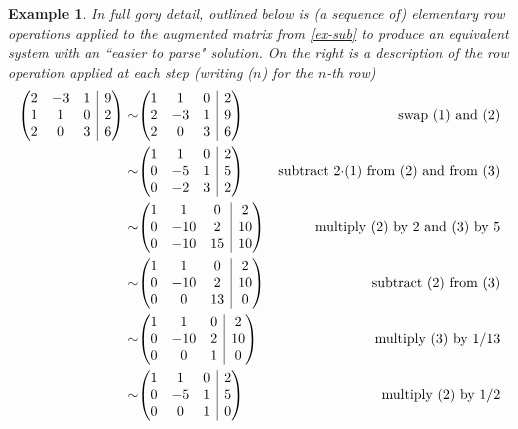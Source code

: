 \documentclass[12pt]{article}
\makeatletter
\numberwithin{equation}{subsection}
\numberwithin{figure}{subsection}
\theoremstyle{note}
\newtheorem{example}[subsection]{Example}
\newenvironment{amatrix}[1]{%
  \left(\begin{array}{@{}*{#1}{c}|c@{}}
}{%
  \end{array}\right)
}
\makeatother
\begin{document}
\begin{example} \label{ex-row-ops}  In full gory detail, outlined below is (a sequence of) elementary row operations applied to the augmented matrix from \eqref{ex-sub} to produce an equivalent system with an ``easier to parse" solution. On the right is a description of the row operation applied at each step (writing ($n$) for the $n$-th row)
{ \allowdisplaybreaks\begin{align*} \begin{amatrix}{3}  2 & -3 & 1 & 9 \\ 1 & 1 & 0 & 2 \\ 2 & 0 & 3 & 6 \end{amatrix} \sim & 
\begin{amatrix}{3}  1 & 1 & 0 & 2 \\ 2 & -3 & 1 & 9 \\  2 & 0 & 3 & 6 \end{amatrix} & \text{swap (1) and (2)}\\
\sim & \begin{amatrix}{3}  1 & 1 & 0 & 2 \\ 0 & -5 & 1 & 5 \\  0 & -2 & 3 & 2 \end{amatrix}& \text{subtract $2\cdot $(1) from (2) and from (3)} \\
\sim & \begin{amatrix}{3}  1 & 1 & 0 & 2 \\ 0 & -10 & 2 & 10 \\  0 & -10 & 15 & 10 \end{amatrix} & \text{multiply (2) by 2 and (3) by 5}\\
\sim & \begin{amatrix}{3}  1 & 1 & 0 & 2 \\ 0 & -10 & 2 & 10 \\  0 & 0 & 13 & 0 \end{amatrix} &\text{subtract (2) from (3)}\\
\sim & \begin{amatrix}{3}  1 & 1 & 0 & 2 \\ 0 & -10 & 2 & 10 \\  0 & 0 & 1 & 0 \end{amatrix} &\text{multiply (3) by 1/13} \\
\sim & \begin{amatrix}{3}  1 & 1 & 0 & 2 \\ 0 & -5 & 1 & 5 \\  0 & 0 & 1 & 0 \end{amatrix} & \text{multiply (2) by 1/2}\\

\end{align*}}
\end{example}
\end{document}
